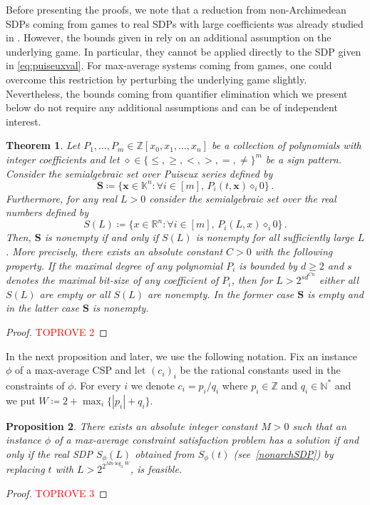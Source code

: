 \documentclass[11pt]{article}
\newtheorem{theorem}{Theorem}[section]
\newtheorem{proposition}[theorem]{Proposition}
\theoremstyle{definition}
\theoremstyle{remark}
\newcommand{\R}{\mathbb{R}}
\newcommand{\Z}{\mathbb{Z}}
\newcommand{\N}{\mathbb{N}}
\newcommand{\puiseux}{\mathbb{K}}
\begin{document}
Before presenting the proofs, we note that a reduction from non-Archimedean SDPs coming from games to real SDPs with large coefficients was already studied in \cite[Theorem~36]{issac2016jsc}. However, the bounds given in \cite{issac2016jsc} rely on an additional assumption on the underlying game. In particular, they cannot be applied directly to the SDP given in \cref{eq:puiseuxval}. For max-average systems coming from games, one could overcome this restriction by perturbing the underlying game slightly. Nevertheless, the bounds coming from quantifier elimination which we present below do not require any additional assumptions and can be of independent interest.

\begin{theorem}\label{real_parameter}
Let $P_1, \dots, P_m \in \Z[x_0,x_1, \dots, x_n]$ be a collection of polynomials with integer coefficients and let $\diamond \in \{\le,\ge,<,>,=, \neq\}^m$ be a sign pattern. Consider the semialgebraic set over Puiseux series defined by 
\[
\bm{S} \coloneqq \{\bm{x} \in \puiseux^n \colon \forall i \in [m], \, P_i(t,\bm{x}) \diamond_i 0\} \, .
\]
Furthermore, for any real $L > 0$ consider the semialgebraic set over the real numbers defined by 
\[
S(L) \coloneqq \{x \in \R^n \colon \forall i \in [m], \, P_i(L,x) \diamond_i 0\} \, .
\]
Then, $\bm{S}$ is nonempty if and only if $S(L)$ is nonempty for all sufficiently large $L$. More precisely, there exists an absolute constant $C > 0$ with the following property. If 
the maximal degree of any polynomial $P_i$ is bounded by $d \ge 2$ 
and $s$ denotes the maximal bit-size of any coefficient of $P_i$, then for $L > 2^{sd^{Cn}}$ either all $S(L)$ are empty or all $S(L)$ are nonempty. In the former case $\bm{S}$ is empty and in the latter case $\bm{S}$ is nonempty.
\end{theorem}
\begin{proof}\textcolor{red}{TOPROVE 2}\end{proof}

In the next proposition and later, 
we use the following notation. Fix an instance $\phi$ of a max-average CSP and let $(c_i)_i$ be the rational constants used in the constraints of $\phi$. For every $i$ we denote $c_i = p_i/q_i$ where $p_i \in \Z$ and $q_i \in \N^*$ and we put $W \coloneqq 2 + \max_i\{|p_i| + q_i\}$.
\begin{proposition}\label{prop:toSDP}
There exists an absolute integer constant $M > 0$ such that 
an instance $\phi$ of a max-average constraint satisfaction problem 
has a solution if and only if 
the real SDP $S_\phi(L)$ obtained from $S_\phi(t)$ (see~\cref{nonarchSDP}) by replacing $t$ with $L > 2^{2^{Mn\log_2 W}}$, is feasible.
\end{proposition}
\begin{proof}\textcolor{red}{TOPROVE 3}\end{proof}
\end{document}
